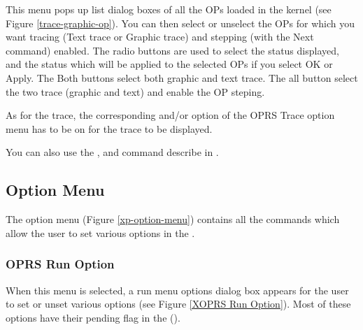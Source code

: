 This menu pops up list dialog boxes of all the OPs loaded in the \XOPRS{} kernel
(see Figure \ref{trace-graphic-op}). You can then select or unselect the OPs
for which you want tracing (Text trace or Graphic trace) and stepping (with the
Next command) enabled. The radio buttons are used to select the status
displayed, and the status which will be applied to the selected OPs if you
select OK or Apply. The Both buttons select both graphic and text trace. The
all button select the two trace (graphic and text) and enable the OP steping.

As for the trace, the corresponding  and/or  option of the OPRS Trace option menu has to be on for the trace to be
displayed.

You can also use the ,  and
 command describe in .

\subsection{Option Menu}


The option menu (Figure \ref{xp-option-menu}) contains all the commands which
allow the user to set various options in the \XPK{}.



\subsubsection{OPRS Run Option}


When this menu is selected, a run menu options dialog box appears for the user
to set or unset various options (see Figure \ref{XOPRS Run Option}). Most of
these options have their pending flag in the \CPK{} ().

